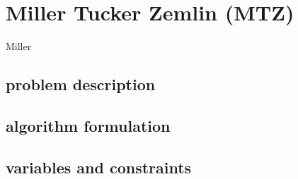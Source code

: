 \section{Miller Tucker Zemlin (MTZ)}

Miller

\subsection{problem description}

\subsection{algorithm formulation}

\subsection{variables and constraints}
